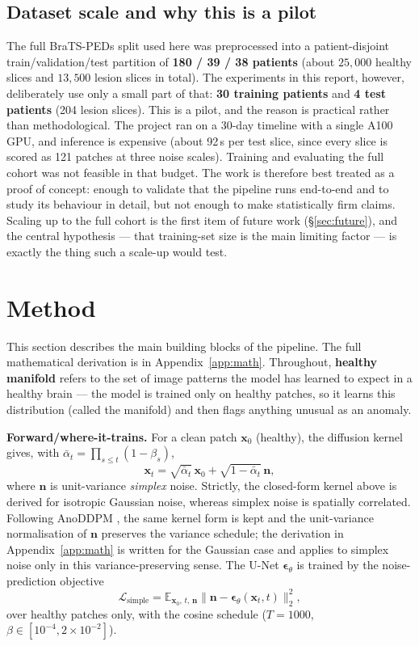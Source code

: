\documentclass[12pt, a4paper]{article}
\theoremstyle{definition}\newtheorem{definition}{Definition}
\newcommand{\E}{\mathbb{E}}
\newcommand{\x}{\bm{x}}
\newcommand{\eps}{\bm{\epsilon}}
\newcommand{\abar}{\bar{\alpha}}
\begin{document}
\subsection{Dataset scale and why this is a pilot}
\label{sec:pilot}
The full BraTS-PEDs split used here was preprocessed into a patient-disjoint
train/validation/test partition of \textbf{180 / 39 / 38 patients} (about $25{,}000$
healthy slices and $13{,}500$ lesion slices in total). The experiments in this report,
however, deliberately use only a small part of that: \textbf{30 training patients} and
\textbf{4 test patients} (204 lesion slices). This is a pilot, and the reason is
practical rather than methodological. The project ran on a 30-day timeline with a single
A100 GPU, and inference is expensive (about 92\,s per test slice, since every slice is
scored as 121 patches at three noise scales). Training and evaluating the full cohort was
not feasible in that budget. The work is therefore best treated as a proof of concept:
enough to validate that the pipeline runs end-to-end and to study its behaviour in
detail, but not enough to make statistically firm claims. Scaling up to the full cohort is
the first item of future work (\S\ref{sec:future}), and the central hypothesis --- that
training-set size is the main limiting factor --- is exactly the thing such a scale-up
would test.

\section{Method}
\label{sec:method}
This section describes the main building blocks of the pipeline. The full
mathematical derivation is in Appendix~\ref{app:math}. Throughout, \textbf{healthy
manifold} refers to the set of image patterns the model has learned to expect in
a healthy brain --- the model is trained only on healthy patches, so it learns this
distribution (called the manifold) and then flags anything unusual as an anomaly.

\textbf{Forward/where-it-trains.} For a clean patch $\x_0$ (healthy), the diffusion
kernel gives, with $\abar_t=\prod_{s\le t}(1-\beta_s)$,
\begin{equation}
\x_t=\sqrt{\abar_t}\,\x_0+\sqrt{1-\abar_t}\,\bm n,
\end{equation}
where $\bm n$ is unit-variance \emph{simplex} noise. Strictly, the closed-form kernel
above is derived for isotropic Gaussian noise, whereas simplex noise is spatially
correlated. Following AnoDDPM \cite{wyatt2022}, the same kernel form is kept and the
unit-variance normalisation of $\bm n$ preserves the variance schedule;
the derivation in Appendix~\ref{app:math} is written for the Gaussian case and applies to
simplex noise only in this variance-preserving sense. The U-Net $\eps_\theta$ is
trained by the noise-prediction objective
\begin{equation}
\mathcal{L}_{\text{simple}}=\E_{\x_0,\,t,\,\bm n}\big\|\bm n-\eps_\theta(\x_t,t)\big\|_2^2,
\end{equation}
over healthy patches only, with the cosine schedule
($T{=}1000$, $\beta\in[10^{-4},2{\times}10^{-2}]$).
\end{document}
